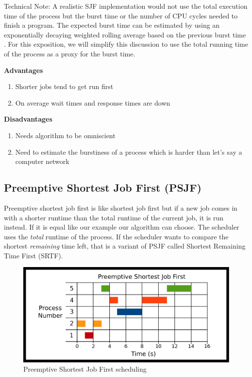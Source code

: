 Technical Note: A realistic SJF implementation would not use the total execution time of the process but the burst time or the number of CPU cycles needed to finish a program.
The expected burst time can be estimated by using an exponentially decaying weighted rolling average based on the previous burst time \cite[Chapter 6]{silberschatz2005operating}.
For this exposition, we will simplify this discussion to use the total running time of the process as a proxy for the burst time.

\textbf{Advantages}

\begin{enumerate}
  \item Shorter jobs tend to get run first
  \item On average wait times and response times are down
\end{enumerate}

\textbf{Disadvantages}
\begin{enumerate}
  \item Needs algorithm to be omniscient
  \item Need to estimate the burstiness of a process which is harder than let's say a computer network
\end{enumerate}

\subsection{Preemptive Shortest Job First (PSJF)}

Preemptive shortest job first is like shortest job first but if a new job comes in with a shorter runtime than the total runtime of the current job, it is run instead.
If it is equal like our example our algorithm can choose.
The scheduler uses the \emph{total} runtime of the process.
If the scheduler wants to compare the shortest \emph{remaining} time left, that is a variant of PSJF called Shortest Remaining Time First (SRTF).

\begin{figure}[H]
\centering
\includegraphics[width=\textwidth]{scheduling/drawings/psjf.eps}
\caption{Preemptive Shortest Job First scheduling}
\end{figure}


